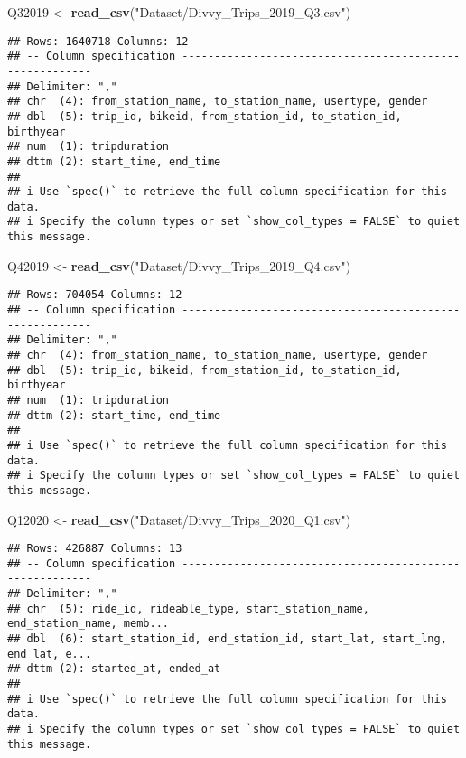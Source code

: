 \documentclass[
]{article}
\newenvironment{Shaded}{\begin{snugshade}}{\end{snugshade}}
\newcommand{\FunctionTok}[1]{\textcolor[rgb]{0.13,0.29,0.53}{\textbf{#1}}}
\newcommand{\NormalTok}[1]{#1}
\newcommand{\OtherTok}[1]{\textcolor[rgb]{0.56,0.35,0.01}{#1}}
\newcommand{\StringTok}[1]{\textcolor[rgb]{0.31,0.60,0.02}{#1}}
\begin{document}
\begin{Shaded}
\begin{Highlighting}[]
\NormalTok{Q32019 }\OtherTok{\textless{}{-}} \FunctionTok{read\_csv}\NormalTok{(}\StringTok{"Dataset/Divvy\_Trips\_2019\_Q3.csv"}\NormalTok{)}
\end{Highlighting}
\end{Shaded}

\begin{verbatim}
## Rows: 1640718 Columns: 12
## -- Column specification --------------------------------------------------------
## Delimiter: ","
## chr  (4): from_station_name, to_station_name, usertype, gender
## dbl  (5): trip_id, bikeid, from_station_id, to_station_id, birthyear
## num  (1): tripduration
## dttm (2): start_time, end_time
## 
## i Use `spec()` to retrieve the full column specification for this data.
## i Specify the column types or set `show_col_types = FALSE` to quiet this message.
\end{verbatim}

\begin{Shaded}
\begin{Highlighting}[]
\NormalTok{Q42019 }\OtherTok{\textless{}{-}} \FunctionTok{read\_csv}\NormalTok{(}\StringTok{"Dataset/Divvy\_Trips\_2019\_Q4.csv"}\NormalTok{)}
\end{Highlighting}
\end{Shaded}

\begin{verbatim}
## Rows: 704054 Columns: 12
## -- Column specification --------------------------------------------------------
## Delimiter: ","
## chr  (4): from_station_name, to_station_name, usertype, gender
## dbl  (5): trip_id, bikeid, from_station_id, to_station_id, birthyear
## num  (1): tripduration
## dttm (2): start_time, end_time
## 
## i Use `spec()` to retrieve the full column specification for this data.
## i Specify the column types or set `show_col_types = FALSE` to quiet this message.
\end{verbatim}

\begin{Shaded}
\begin{Highlighting}[]
\NormalTok{Q12020 }\OtherTok{\textless{}{-}} \FunctionTok{read\_csv}\NormalTok{(}\StringTok{"Dataset/Divvy\_Trips\_2020\_Q1.csv"}\NormalTok{)}
\end{Highlighting}
\end{Shaded}

\begin{verbatim}
## Rows: 426887 Columns: 13
## -- Column specification --------------------------------------------------------
## Delimiter: ","
## chr  (5): ride_id, rideable_type, start_station_name, end_station_name, memb...
## dbl  (6): start_station_id, end_station_id, start_lat, start_lng, end_lat, e...
## dttm (2): started_at, ended_at
## 
## i Use `spec()` to retrieve the full column specification for this data.
## i Specify the column types or set `show_col_types = FALSE` to quiet this message.
\end{verbatim}
\end{document}
